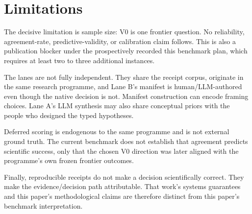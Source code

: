 \section{Limitations}

The decisive limitation is sample size: V0 is one frontier question. No reliability, agreement-rate, predictive-validity, or calibration claim follows. This is also a publication blocker under the prospectively recorded this benchmark plan, which requires at least two to three additional instances.

The lanes are not fully independent. They share the receipt corpus, originate in the same research programme, and Lane B's manifest is human/LLM-authored even though the native decision is not. Manifest construction can encode framing choices. Lane A's LLM synthesis may also share conceptual priors with the people who designed the typed hypotheses.

Deferred scoring is endogenous to the same programme and is not external ground truth. The current benchmark does not establish that agreement predicts scientific success, only that the chosen V0 direction was later aligned with the programme's own frozen frontier outcomes.

Finally, reproducible receipts do not make a decision scientifically correct. They make the evidence/decision path attributable. That work’s systems guarantees and this paper’s methodological claims are therefore distinct from this paper’s benchmark interpretation.